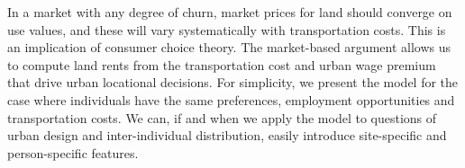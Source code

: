 






In a market with any degree of churn, market prices for land should converge on use values, and these will vary systematically with transportation costs. This is an implication of consumer choice theory. The market-based argument allows us to compute land rents from the transportation cost and urban wage premium that drive urban locational decisions. 
For simplicity, we present the model for the case where individuals have the same preferences, employment opportunities and transportation costs. We can, if and when we apply the model to questions of urban design and inter-individual distribution, easily introduce site-specific and person-specific features.  

